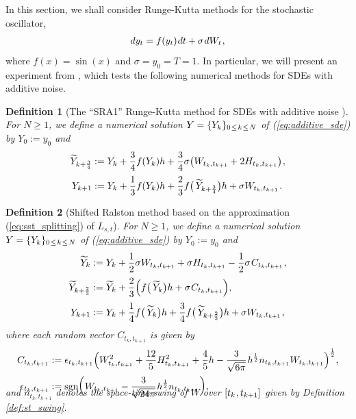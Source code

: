 \documentclass[sn-mathphys-num]{sn-jnl}%
\newtheorem{definition}{Definition}%
\newcommand{\m}{\hspace{0.25mm}}
\newcommand{\sgn}{\mathrm{sgn}}
\begin{document}
In this section, we shall consider Runge-Kutta methods for the stochastic oscillator,
\begin{align}\label{eq:additive_sde}
dy_t = f(y_t)\m dt + \sigma\m dW_t\m,
\end{align}
where $f(x) = \sin(x)$ and $\sigma = y_0 = T = 1$. In particular, we will present an experiment\vspace{0.5mm} from \cite{foster2024splitting}, which tests the following numerical methods for SDEs with additive noise. \medbreak
\begin{definition}[The ``SRA1'' Runge-Kutta method for SDEs with additive noise \cite{rossler2010srk}]  For $N\geq 1$, we define a numerical solution $Y = \{Y_k\}_{0\m\leq\m k\m\leq\m N}$ of (\ref{eq:additive_sde}) by $Y_0 := y_0$ and\vspace*{-1mm}
\begin{align}\label{eq:SRA1}
\widetilde{Y}_{k+\frac{3}{4}} & := Y_k + \frac{3}{4}f(Y_k)h + \frac{3}{4}\sigma\big(W_{t_k, t_{k+1}} + 2H_{t_k, t_{k+1}}\big)\m,\nonumber\\[2pt]
Y_{k+1} & :=  Y_k + \frac{1}{3}f(Y_k)h + \frac{2}{3}f\big(\,\widetilde{Y}_{k+\frac{3}{4}}\big)h + \sigma W_{t_k, t_{k+1}}\m.
\end{align}
\end{definition}\medbreak
\begin{definition}[Shifted Ralston method \cite{foster2024splitting} based on the approximation (\ref{eq:sst_splitting}) of $L_{s,t}$] For $N\geq 1$, we define a numerical solution $Y = \{Y_k\}_{0\m\leq\m k\m\leq\m N}$ of (\ref{eq:additive_sde}) by $Y_0 := y_0$ and\vspace*{-1mm}
\begin{align}\label{eq:shifted_ralston}
\widetilde{Y}_k & := Y_k + \frac{1}{2}\sigma W_{t_k, t_{k+1}} + \sigma H_{t_k, t_{k+1}} - \frac{1}{2}\sigma\m C_{t_k, t_{k+1}}\m,\nonumber\\[2pt]
\widetilde{Y}_{k+\frac{2}{3}} & :=  \widetilde{Y}_k + \frac{2}{3}\Big(f\big(\,\widetilde{Y}_k\big)h + \sigma\m C_{t_k, t_{k+1}}\Big),\nonumber\\[2pt]
Y_{k+1} & := Y_k + \frac{1}{4}f\big(\,\widetilde{Y}_k\big)h + \frac{3}{4}f\big(\,\widetilde{Y}_{k+\frac{2}{3}}\big)h + \sigma W_{t_k, t_{k+1}}\m,
\end{align}
where each random vector $C_{t_k, t_{k+1}}$ is given by\vspace*{-2mm}
\begin{align*}
C_{t_k, t_{k+1}} & := \epsilon_{t_k, t_{k+1}}\Big(W_{t_k, t_{k+1}}^2 + \frac{12}{5}H_{t_k, t_{k+1}}^2 + \frac{4}{5}h - \frac{3}{\sqrt{6\pi}}\m h^\frac{1}{2} n_{t_k, t_{k+1}} W_{t_k, t_{k+1}}\Big)^\frac{1}{2},\\
\epsilon_{t_k, t_{k+1}} & := \sgn\bigg(W_{t_k, t_{k+1}} - \frac{3}{\sqrt{24\pi}}\m h^\frac{1}{2} n_{t_k, t_{k+1}}\bigg),\\[-20pt]
\end{align*}
and $n_{t_k, t_{k+1}}$ denotes the space-time swing of $W$ over $[t_k\m, t_{k+1}]$ given by Definition \ref{def:st_swing}.
\end{definition}\medbreak
\end{document}
